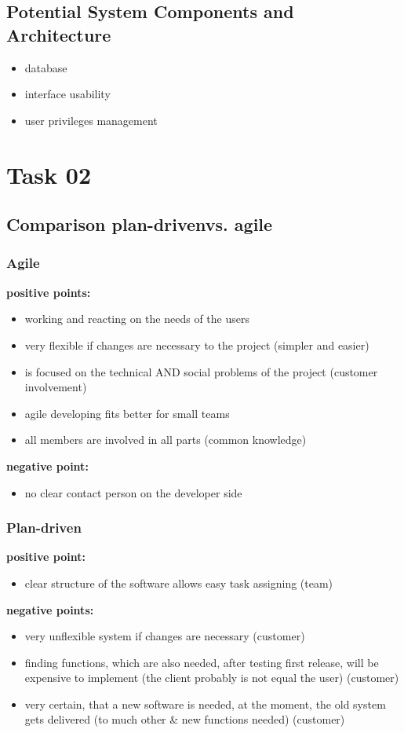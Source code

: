 \documentclass[11pt,a4paper]{scrreprt}
\begin{document}
\section{Potential System Components and Architecture}
\begin{itemize}
\item database
\item interface usability 
\item user privileges management
\end{itemize}



\chapter{Task 02}
\section{Comparison \glqq plan-driven\grqq  vs. \glqq agile\grqq}
\subsection{Agile}
\textbf{positive points:}
\begin{itemize}
\item working and reacting on the needs of the users 
\item very flexible if changes are necessary to the project (simpler and easier)
\item is focused on the technical AND social problems of the project (customer involvement)
\item agile developing fits better for small teams
\item all members are involved in all parts (common knowledge)
\end{itemize}
\textbf{negative point:}
\begin{itemize}
\item no clear contact person on the developer side
 \end{itemize}
\subsection{Plan-driven}
\textbf{positive point:}
\begin{itemize}
\item clear structure of the software allows easy task assigning (team) 
\end{itemize}
\textbf{negative points:}
\begin{itemize}
\item very unflexible system if changes are necessary (customer)
\item finding functions, which are also needed, after testing first release, will be expensive to implement (the client probably is not equal the user) (customer)
\item very certain, that a new software is needed, at the moment, the old system gets delivered (to much other & new functions needed) (customer)
 \end{itemize}
\end{document}
